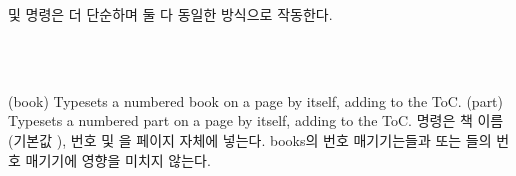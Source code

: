 \cmd{\book} 및 \cmd{\part}명령은 더 단순하며 둘 다 동일한 방식으로 작동한다.
\begin{syntax}
\cmd{\book} \\
\cmd{\part} \\
\end{syntax}
\glossary(book)%
  {}%
  {Typesets a numbered book  on a page by itself, adding
    to the ToC.}
\glossary(part)%
  {}%
  {Typesets a numbered part  on a page by itself, adding
    to the ToC.}
\cmd{\book}  명령은 책 이름 (기본값 \texttt{\bookname}), 번호 및 을 페이지 자체에 넣는다.
books의 번호 매기기는\cmd{\part}들과  또는 \cmd{\chapter} 들의 번호 매기기에 영향을 미치지 않는다.

